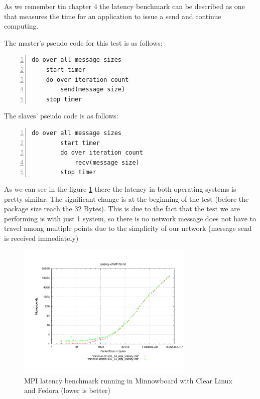 As we remember tin chapter 4 the latency benchmark can be described as one that
measures the time for an application to issue a send and continue computing.

The master's pseudo code for this test is as follows:

\begin{lstlisting}[frame=single,numbers=left]
do over all message sizes 
    start timer
    do over iteration count 
        send(message size) 
    stop timer
\end{lstlisting}    

The slaves' pseudo code is as follows:

\begin{lstlisting}[frame=single,numbers=left]
   do over all message sizes 
        start timer
        do over iteration count 
            recv(message size) 
        stop timer
\end{lstlisting}


As we can see in the figure \ref{mpi_latency_clr_fedora} there the latency in
both operating systems is pretty similar. The significant change is at the
beginning of the test (before the package size reach the 32 Bytes). This is due
to the fact that the test we are performing is with just 1 system, so there is
no network message does not have to travel among multiple points due to the
simplicity of our network (message send is received immediately) 

\begin{figure}[H]
\centering
\includegraphics[width=0.75\textwidth]{images/mpbench_clr_experiments/mpi_latency.pdf}
\caption{MPI latency benchmark running in Minnowboard with Clear Linux and
Fedora (lower is better)}
\label{mpi_latency_clr_fedora}
\end{figure}



